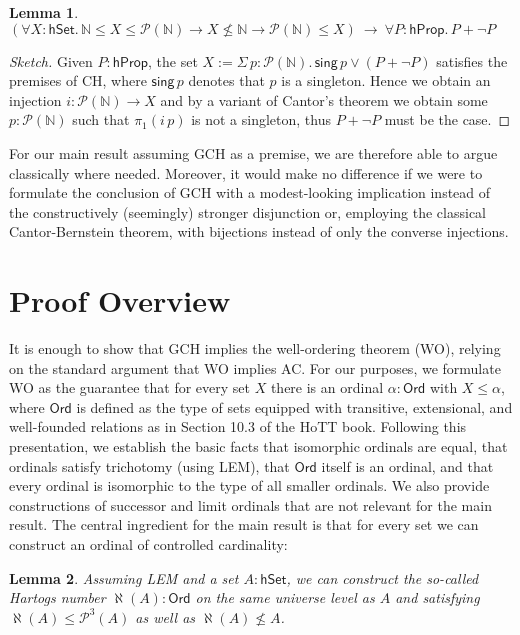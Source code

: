 \documentclass{easychair}
\newcommand{\nat}{\mathbb{N}}
\newcommand{\pow}{\mathcal{P}}
\newcommand{\hprop}{\mathsf{hProp}}
\newcommand{\hset}{\mathsf{hSet}}
\newcommand{\Ord}{\mathsf{Ord}}
\newtheorem{lemma}{Lemma}
\begin{document}
\begin{lemma}
	$(\forall X:\hset.\,\nat \le X\le \pow(\nat)\to X\not\le \nat\to \pow(\nat)\le X)~\to~\forall P:\hprop.\,P+\neg P$
\end{lemma}
\begin{proof}[Sketch]
	Given $P:\hprop$, the set $X:=\Sigma\, p:\pow(\nat).\,\mathsf{sing}\,p\lor (P+\neg P)$ satisfies the premises of CH, where $\mathsf{sing}\,p$ denotes that $p$ is a singleton.
	Hence we obtain an injection $i:\pow(\nat)\to X$ and by a variant of Cantor's theorem we obtain some $p:\pow(\nat)$ such that $\pi_1(i\,p)$ is not a singleton, thus $P+\neg P$ must be the case.
\end{proof}

For our main result assuming GCH as a premise, we are therefore able to argue classically where needed.
Moreover, it would make no difference if we were to formulate the conclusion of GCH with a modest-looking implication instead of the constructively (seemingly) stronger disjunction or, employing the classical Cantor-Bernstein theorem, with bijections instead of only the converse injections.




\section{Proof Overview}

It is enough to show that GCH implies the well-ordering theorem (WO), relying on the standard argument that WO implies AC.
For our purposes, we formulate WO as the guarantee that for every set $X$ there is an ordinal $\alpha:\Ord$ with $X\le \alpha$, where $\Ord$ is defined as the type of sets equipped with transitive, extensional, and well-founded relations as in Section 10.3 of the HoTT book.
Following this presentation, we establish the basic facts that isomorphic ordinals are equal, that ordinals satisfy trichotomy (using LEM), that $\Ord$ itself is an ordinal, and that every ordinal is isomorphic to the type of all smaller ordinals.
We also provide constructions of successor and limit ordinals that are not relevant for the main result.
The central ingredient for the main result is that for every set we can construct an ordinal of controlled cardinality:

\newpage

\begin{lemma}
	\label{hartogs}
	Assuming LEM and a set $A:\hset$, we can construct the so-called \emph{Hartogs number} $\aleph(A):\Ord$ on the same universe level as $A$ and satisfying $\aleph(A)\le\pow^3(A)$ as well as $\aleph(A)\not\le A$.
\end{lemma}
\end{document}
